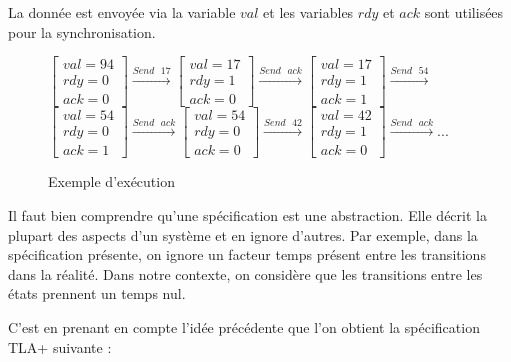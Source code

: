 \documentclass[12pt,a4paper]{article}
\begin{document}
La donnée est envoyée via la variable $val$ et les variables $rdy$ et $ack$ sont utilisées pour la synchronisation.

\begin{figure}[ht]
	\begin{center}
		$\begin{bmatrix}
			val = 94 \\
			rdy = 0 \\
			ack = 0 
		\end{bmatrix}
		\xrightarrow{Send \text{ } 17}
		\begin{bmatrix}
			val = 17 \\
			rdy = 1 \\
			ack = 0 
		\end{bmatrix}
		\xrightarrow{Send \text{ } ack}
		\begin{bmatrix}
			val = 17 \\
			rdy = 1 \\
			ack = 1 
		\end{bmatrix}
		\xrightarrow{Send \text{ } 54}
		$\vspace{0.5cm}
		$		
		\begin{bmatrix}
			val = 54 \\
			rdy = 0 \\
			ack = 1 
		\end{bmatrix}
		\xrightarrow{Send \text{ } ack}
		\begin{bmatrix}
			val = 54 \\
			rdy = 0 \\
			ack = 0 
		\end{bmatrix}
		\xrightarrow{Send \text{ } 42}
		\begin{bmatrix}
			val = 42 \\
			rdy = 1 \\
			ack = 0 
		\end{bmatrix}
		\xrightarrow{Send \text{ } ack} ...$
	\end{center}
	\caption{Exemple d'exécution}
\end{figure}

Il faut bien comprendre qu'une spécification est une abstraction. Elle décrit la plupart des aspects d'un système et en ignore d'autres. Par exemple, dans la spécification présente,  on ignore un facteur temps présent entre les transitions dans la réalité. Dans notre contexte, on considère que les transitions entre les états prennent un temps nul.

C'est en prenant en compte l'idée précédente que l'on obtient la spécification TLA+ suivante :
\end{document}

